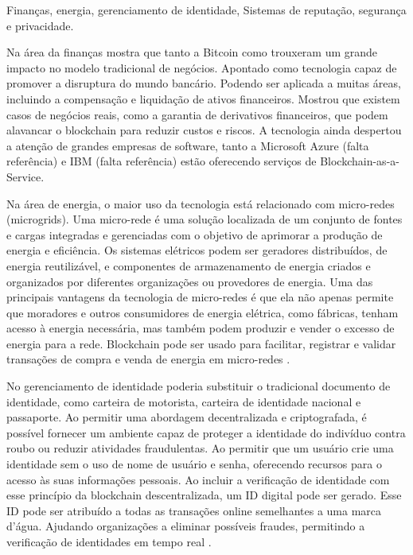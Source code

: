 
Finanças, energia, gerenciamento de identidade, Sistemas de reputação, segurança e privacidade.

Na área da finanças \citet{zheng2018blockchain} mostra que tanto a Bitcoin \citep{Nakamoto2009} como \citet{linux_foundation_hyperledger_2015} trouxeram um grande impacto no modelo tradicional de negócios. Apontado como tecnologia capaz de promover a disruptura do mundo bancário. Podendo ser aplicada a muitas áreas, incluindo a compensação e liquidação de ativos financeiros. Mostrou que existem casos de negócios reais, como a garantia de derivativos financeiros, que podem alavancar o blockchain para reduzir custos e riscos. A tecnologia ainda despertou a atenção de grandes empresas de software, tanto a Microsoft Azure (falta referência) e IBM (falta referência) estão oferecendo serviços de Blockchain-as-a-Service.

Na área de energia, o maior uso da tecnologia está relacionado com micro-redes (microgrids). Uma micro-rede é uma solução localizada de um conjunto de fontes e cargas integradas e gerenciadas com o objetivo de aprimorar a produção de energia e eficiência. Os sistemas elétricos podem ser geradores distribuídos, de energia reutilizável, e componentes de armazenamento de energia criados e organizados por diferentes organizações ou provedores de energia. Uma das principais vantagens da tecnologia de micro-redes é que ela não apenas permite que moradores e outros consumidores de energia elétrica, como fábricas, tenham acesso à energia necessária, mas também podem produzir e vender o excesso de energia para a rede. Blockchain pode ser usado para facilitar, registrar e validar transações de compra e venda de energia em micro-redes \citep{monrat2019survey}.

No gerenciamento de identidade poderia substituir o tradicional documento de identidade, como carteira de motorista, carteira de identidade nacional e passaporte. Ao permitir uma abordagem decentralizada e criptografada, é possível fornecer um ambiente capaz de proteger a identidade do indivíduo contra roubo ou reduzir atividades fraudulentas. Ao permitir que um usuário crie uma identidade sem o uso de nome de usuário e senha, oferecendo recursos para o acesso às suas informações pessoais. Ao incluir a verificação de identidade com esse princípio da blockchain descentralizada, um ID digital pode ser gerado. Esse ID pode ser atribuído a todas as transações online semelhantes a uma marca d'água. Ajudando organizações a eliminar possíveis fraudes, permitindo a verificação de identidades em tempo real \citep{monrat2019survey}.

